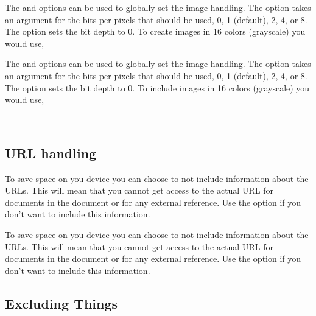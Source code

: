 \begin{latexonly}
The  and 
options can be used to globally set the image handling. The 
option takes an argument for the bits per pixels that should be used,
0, 1 (default), 2, 4, or 8.  The  option sets the
bit depth to 0. To create images in 16 colors (grayscale) you would use,
\end{latexonly}
\begin{htmlonly}
The  and 
options can be used to globally set the image handling. The 
option takes an argument for the bits per pixels that should be used,
0, 1 (default), 2, 4, or 8.  The  option sets the
bit depth to 0. To include images in 16 colors (grayscale) you would use,
\end{htmlonly}\\



\subsection{URL handling}

\begin{latexonly}
To save space on you device you can choose to not include information
about the URLs. This will mean that you cannot get access to the actual
URL for documents in the document or for any external reference. Use
the  option if you don't want to
include this information.
\end{latexonly}
\begin{htmlonly}
To save space on you device you can choose to not include information
about the URLs. This will mean that you cannot get access to the actual
URL for documents in the document or for any external reference. Use
the  option if you don't want to
include this information.
\end{htmlonly}


\subsection{Excluding Things}

